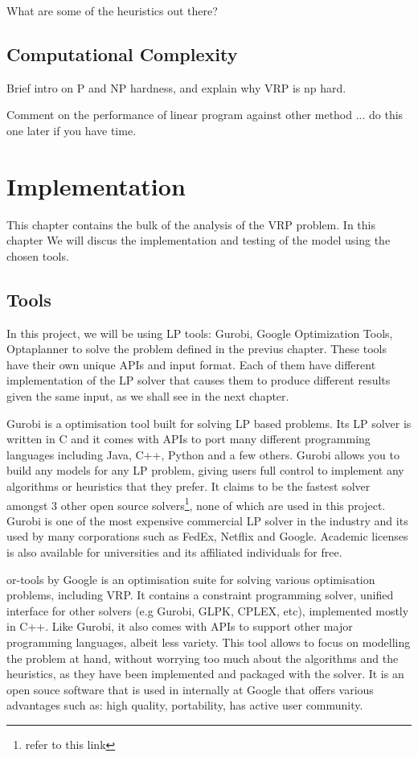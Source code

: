 \documentclass[a4paper, 12pt]{report}
\begin{document}
What are some of the heuristics out there?

\section{Computational Complexity}
Brief intro on P and NP hardness, and explain why VRP is np hard.

Comment on the performance of linear program against other method
... do this one later if you have time.


\chapter{Implementation}

This chapter contains the bulk of the analysis of the VRP problem. In this chapter We will discus the implementation and testing of the model
using the chosen tools.

\section{Tools}
In this project, we will be using LP tools: Gurobi, Google Optimization Tools, Optaplanner to solve the problem
defined in the previus chapter. These tools have their own unique APIs and input format. Each of them
have different implementation of the LP solver that causes them to produce different results given the same input,
as we shall see in the next chapter.

Gurobi is a optimisation tool built for solving LP based problems. Its LP solver is written in C and it comes with
APIs to port many different programming languages including Java, C++, Python and a few others. Gurobi allows you
to build any models for any LP problem, giving users full control to implement any algorithms or heuristics that they
prefer. It claims to be the fastest solver amongst 3 other open source solvers\footnote{refer to
this link}, none of which are used in this project. Gurobi is one of the most expensive commercial LP solver in the industry
and its used by many corporations such as FedEx, Netflix and Google. Academic licenses is also available for universities
and its affiliated individuals for free.

or-tools by Google is an optimisation suite for solving various optimisation problems, including VRP. It contains a constraint programming
solver, unified interface for other solvers (e.g Gurobi, GLPK, CPLEX, etc), implemented mostly in C++. Like Gurobi, it also comes with APIs
to support other major programming languages, albeit less variety. This tool allows to focus on modelling the problem at hand, without worrying
too much about the algorithms and the heuristics, as they have been implemented and packaged with the solver. It is an open souce
software that is used in internally at Google that offers various advantages such as: high quality, portability, has active user community.
\end{document}
